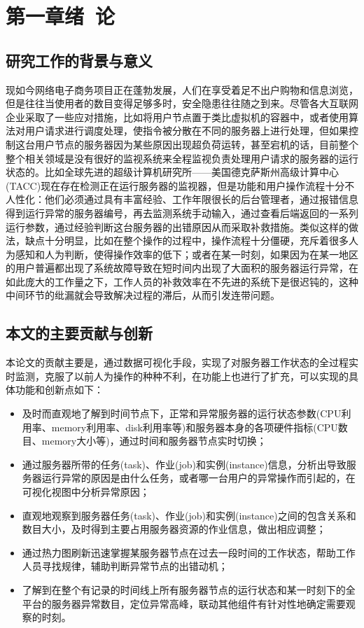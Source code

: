 \section{第一章\quad 绪\ 论}
\subsection{研究工作的背景与意义}
现如今网络电子商务项目正在蓬勃发展，人们在享受着足不出户购物和信息浏览，但是往往当使用者的数目变得足够多时，安全隐患往往随之到来。尽管各大互联网企业采取了一些应对措施，比如将用户节点置于类比虚拟机的容器中，或者使用算法对用户请求进行调度处理，使指令被分散在不同的服务器上进行处理，但如果控制这台用户节点的服务器因为某些原因出现超负荷运转，甚至宕机的话，目前整个整个相关领域是没有很好的监视系统来全程监视负责处理用户请求的服务器的运行状态的。比如全球先进的超级计算机研究所——美国德克萨斯州高级计算中心(TACC)现在存在检测正在运行服务器的监视器，但是功能和用户操作流程十分不人性化：他们必须通过具有丰富经验、工作年限很长的后台管理者，通过报错信息得到运行异常的服务器编号，再去监测系统手动输入，通过查看后端返回的一系列运行参数，通过经验判断这台服务器的出错原因从而采取补救措施。类似这样的做法，缺点十分明显，比如在整个操作的过程中，操作流程十分僵硬，充斥着很多人为感知和人为判断，使得操作效率的低下；或者在某一时刻，如果因为在某一地区的用户普遍都出现了系统故障导致在短时间内出现了大面积的服务器运行异常，在如此庞大的工作量之下，工作人员的补救效率在不先进的系统下是很迟钝的，这种中间环节的纰漏就会导致解决过程的滞后，从而引发连带问题。
\subsection{本文的主要贡献与创新}
本论文的贡献主要是，通过数据可视化手段，实现了对服务器工作状态的全过程实时监测，克服了以前人为操作的种种不利，在功能上也进行了扩充，可以实现的具体功能和创新点如下：
\begin{itemize}
	\item 及时而直观地了解到时间节点下，正常和异常服务器的运行状态参数(CPU利用率、memory利用率、disk利用率等)和服务器本身的各项硬件指标(CPU数目、memory大小等)，通过时间和服务器节点实时切换；
	
	\item 通过服务器所带的任务(task)、作业(job)和实例(instance)信息，分析出导致服务器运行异常的原因是由什么任务，或者哪一台用户的异常操作而引起的，在可视化视图中分析异常原因；
	
	\item 直观地观察到服务器任务(task)、作业(job)和实例(instance)之间的包含关系和数目大小，及时得到主要占用服务器资源的作业信息，做出相应调整；
	
	\item 通过热力图刷新迅速掌握某服务器节点在过去一段时间的工作状态，帮助工作人员寻找规律，辅助判断异常节点的出错动机；
	
	\item 了解到在整个有记录的时间线上所有服务器节点的运行状态和某一时刻下的全平台的服务器异常数目，定位异常高峰，联动其他组件有针对性地确定需要观察的时刻。

\end{itemize}
	
